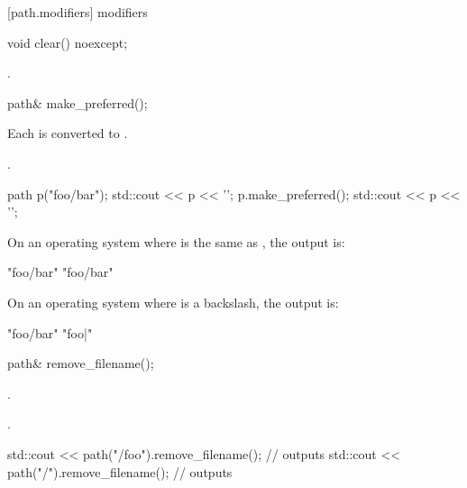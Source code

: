 [path.modifiers]{ modifiers}

%
\begin{itemdecl}
void clear() noexcept;
\end{itemdecl}

\begin{itemdescr}
\pnum
\postcondition {}.
\end{itemdescr}

%
\begin{itemdecl}
path& make_preferred();
\end{itemdecl}

\begin{itemdescr}
\pnum
\effects Each 
  is converted to .

\pnum
\returns {}.

\pnum
\begin{example}
\begin{codeblock}
path p("foo/bar");
std::cout << p << '\n';
p.make_preferred();
std::cout << p << '\n';
\end{codeblock}
On an operating system where  is the same as
, the output is:
\begin{codeblock}
"foo/bar"
"foo/bar"
\end{codeblock}
On an operating system where  is a backslash, the
output is:
\begin{codeblock}
"foo/bar"
"foo\bar"
\end{codeblock}
\end{example}
\end{itemdescr}

%
\begin{itemdecl}
path& remove_filename();
\end{itemdecl}

\begin{itemdescr}
\pnum
\postcondition {}.

\pnum
\returns {}.

\pnum
\begin{example}
\begin{codeblock}
std::cout << path("/foo").remove_filename();  // outputs 
std::cout << path("/").remove_filename();     // outputs 
\end{codeblock}
\end{example}
\end{itemdescr}

